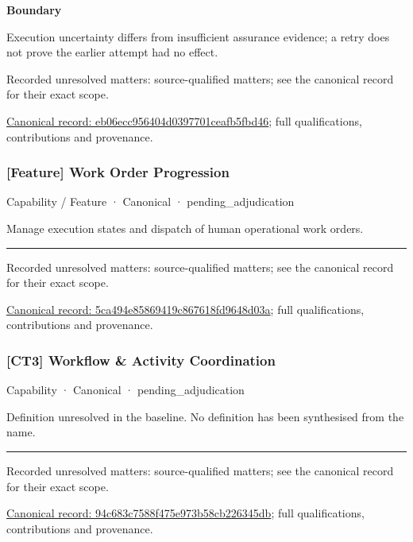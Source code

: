 \textbf{Boundary}



Execution uncertainty differs from insufficient assurance evidence; a retry does not prove the earlier attempt had no effect.


{\small Recorded unresolved matters: source-qualified matters; see the canonical record for their exact scope.}\par
{\footnotesize \href{../../../../continuum/strategy/capability/feature/eb06ecc956404d0397701ceafb5fbd46.md}{Canonical record: eb06ecc956404d0397701ceafb5fbd46}; full qualifications, contributions and provenance.}\par
\subsubsection{[Feature] Work Order Progression}

\label{element:5ca494e85869419c867618fd9648d03a}
{\small Capability / Feature · Canonical · pending\_adjudication}\par

Manage execution states and dispatch of human operational work orders.



\medskip\hrule\medskip

{\small Recorded unresolved matters: source-qualified matters; see the canonical record for their exact scope.}\par
{\footnotesize \href{../../../../continuum/strategy/capability/feature/5ca494e85869419c867618fd9648d03a.md}{Canonical record: 5ca494e85869419c867618fd9648d03a}; full qualifications, contributions and provenance.}\par
\subsubsection{[CT3] Workflow \& Activity Coordination}

\label{element:94c683c7588f475e973b58cb226345db}
{\small Capability · Canonical · pending\_adjudication}\par

Definition unresolved in the baseline. No definition has been synthesised from the name.



\medskip\hrule\medskip

{\small Recorded unresolved matters: source-qualified matters; see the canonical record for their exact scope.}\par
{\footnotesize \href{../../../../continuum/strategy/capability/94c683c7588f475e973b58cb226345db.md}{Canonical record: 94c683c7588f475e973b58cb226345db}; full qualifications, contributions and provenance.}\par
